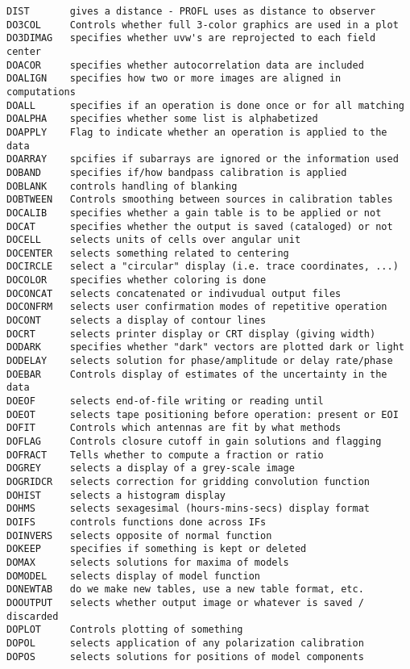 \begin{verbatim}
DIST       gives a distance - PROFL uses as distance to observer
DO3COL     Controls whether full 3-color graphics are used in a plot
DO3DIMAG   specifies whether uvw's are reprojected to each field center
DOACOR     specifies whether autocorrelation data are included
DOALIGN    specifies how two or more images are aligned in computations
DOALL      specifies if an operation is done once or for all matching
DOALPHA    specifies whether some list is alphabetized
DOAPPLY    Flag to indicate whether an operation is applied to the data
DOARRAY    spcifies if subarrays are ignored or the information used
DOBAND     specifies if/how bandpass calibration is applied
DOBLANK    controls handling of blanking
DOBTWEEN   Controls smoothing between sources in calibration tables
DOCALIB    specifies whether a gain table is to be applied or not
DOCAT      specifies whether the output is saved (cataloged) or not
DOCELL     selects units of cells over angular unit
DOCENTER   selects something related to centering
DOCIRCLE   select a "circular" display (i.e. trace coordinates, ...)
DOCOLOR    specifies whether coloring is done
DOCONCAT   selects concatenated or indivudual output files
DOCONFRM   selects user confirmation modes of repetitive operation
DOCONT     selects a display of contour lines
DOCRT      selects printer display or CRT display (giving width)
DODARK     specifies whether "dark" vectors are plotted dark or light
DODELAY    selects solution for phase/amplitude or delay rate/phase
DOEBAR     Controls display of estimates of the uncertainty in the data
DOEOF      selects end-of-file writing or reading until
DOEOT      selects tape positioning before operation: present or EOI
DOFIT      Controls which antennas are fit by what methods
DOFLAG     Controls closure cutoff in gain solutions and flagging
DOFRACT    Tells whether to compute a fraction or ratio
DOGREY     selects a display of a grey-scale image
DOGRIDCR   selects correction for gridding convolution function
DOHIST     selects a histogram display
DOHMS      selects sexagesimal (hours-mins-secs) display format
DOIFS      controls functions done across IFs
DOINVERS   selects opposite of normal function
DOKEEP     specifies if something is kept or deleted
DOMAX      selects solutions for maxima of models
DOMODEL    selects display of model function
DONEWTAB   do we make new tables, use a new table format, etc.
DOOUTPUT   selects whether output image or whatever is saved / discarded
DOPLOT     Controls plotting of something
DOPOL      selects application of any polarization calibration
DOPOS      selects solutions for positions of model components

\end{verbatim}
